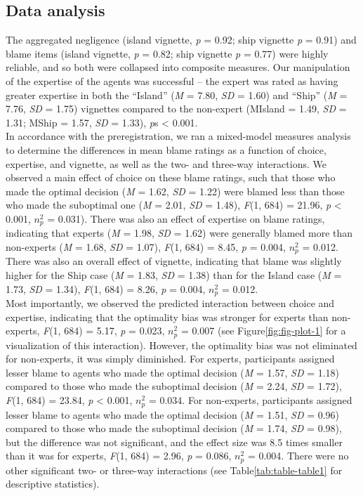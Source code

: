 \documentclass[
  man,floatsintext]{apa6}
\begin{document}
\hypertarget{data-analysis}{%
\subsection{Data analysis}\label{data-analysis}}

The aggregated negligence (island vignette, \emph{p} = 0.92; ship vignette \emph{p} = 0.91) and blame items (island vignette, \emph{p} = 0.82; ship vignette \emph{p} = 0.77) were highly reliable, and so both were collapsed into composite measures. Our manipulation of the expertise of the agents was successful -- the expert was rated as having greater expertise in both the ``Island'' (\emph{M} = 7.80, \emph{SD} = 1.60) and ``Ship'' (\emph{M} = 7.76, \emph{SD} = 1.75) vignettes compared to the non-expert (MIsland = 1.49, \emph{SD} = 1.31; MShip = 1.57, \emph{SD} = 1.33), \emph{p}s \textless{} 0.001.\\
In accordance with the preregistration, we ran a mixed-model measures analysis to determine the differences in mean blame ratings as a function of choice, expertise, and vignette, as well as the two- and three-way interactions. We observed a main effect of choice on these blame ratings, such that those who made the optimal decision (\emph{M} = 1.62, \emph{SD} = 1.22) were blamed less than those who made the suboptimal one (\emph{M} = 2.01, \emph{SD} = 1.48), \emph{F}(1, 684) = 21.96, \emph{p} \textless{} 0.001, \(n^2_p\) = 0.031). There was also an effect of expertise on blame ratings, indicating that experts (\emph{M} = 1.98, \emph{SD} = 1.62) were generally blamed more than non-experts (\emph{M} = 1.68, \emph{SD} = 1.07), \emph{F}(1, 684) = 8.45, \emph{p} = 0.004, \(n^2_p\) = 0.012. There was also an overall effect of vignette, indicating that blame was slightly higher for the Ship case (\emph{M} = 1.83, \emph{SD} = 1.38) than for the Island case (\emph{M} = 1.73, \emph{SD} = 1.34), \emph{F}(1, 684) = 8.26, \emph{p} = 0.004, \(n^2_p\) = 0.012.\\
Most importantly, we observed the predicted interaction between choice and expertise, indicating that the optimality bias was stronger for experts than non-experts, \emph{F}(1, 684) = 5.17, \emph{p} = 0.023, \(n^2_p\) = 0.007 (see Figure\ref{fig:fig-plot-1} for a visualization of this interaction). However, the optimality bias was not eliminated for non-experts, it was simply diminished. For experts, participants assigned lesser blame to agents who made the optimal decision (\emph{M} = 1.57, \emph{SD} = 1.18) compared to those who made the suboptimal decision (\emph{M} = 2.24, \emph{SD} = 1.72), \emph{F}(1, 684) = 23.84, \emph{p} \textless{} 0.001, \(n^2_p\) = 0.034. For non-experts, participants assigned lesser blame to agents who made the optimal decision (\emph{M} = 1.51, \emph{SD} = 0.96) compared to those who made the suboptimal decision (\emph{M} = 1.74, \emph{SD} = 0.98), but the difference was not significant, and the effect size was 8.5 times smaller than it was for experts, \emph{F}(1, 684) = 2.96, \emph{p} = 0.086, \(n^2_p\) = 0.004. There were no other significant two- or three-way interactions (see Table\ref{tab:table-table1} for descriptive statistics).
\end{document}
